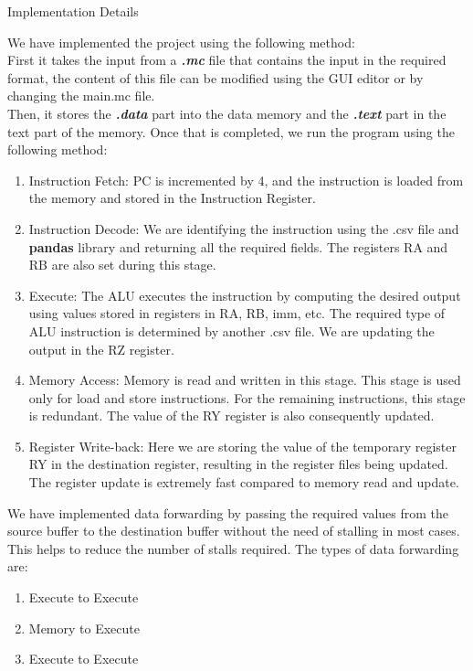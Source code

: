 \documentclass{article}
\begin{document}
\newpage
\begin{centering}
\begin{Huge}
\textsf{Implementation Details}\\
\end{Huge}
\end{centering}
\protect\vspace{1.0cm}
We have implemented the project using the following method:\\

First it takes the input from a \textsl{\textbf{.mc}} file that contains the input in the required format, the content of this file can be modified using the GUI editor or by changing the main.mc file.\\
Then, it stores the \textsl{\textbf{.data}} part into the data memory and the \textsl{\textbf{.text}} part in the text part of the memory.
Once that is completed, we run the program using the following method:
\begin{enumerate}
\item Instruction Fetch: PC is incremented by 4, and the instruction is loaded from the memory and stored in the Instruction Register.
\item Instruction Decode: We are identifying the instruction using the .csv file and {\bf pandas} library and returning all the required fields. The registers RA and RB are also set during this stage.
\item Execute: The ALU executes the instruction by computing the desired output using values stored in registers in RA, RB, imm, etc. The required type of ALU instruction is determined by another .csv file. We are updating the output in the RZ register.
\item Memory Access: Memory is read and written in this stage. This stage is used only for load and store instructions. For the remaining instructions, this stage is redundant. The value of the RY register is also consequently updated.
\item Register Write-back: Here we are storing the value of the temporary register RY in the destination register, resulting in the register files being updated. The register update is extremely fast compared to memory read and update.
\end{enumerate}
\newpage
We have implemented data forwarding by passing the required values from the source buffer to the destination buffer without the need of stalling in most cases. This helps to reduce the number of stalls required. The types of data forwarding are:
\begin{enumerate}
    \item Execute to Execute
    \item Memory to Execute
    \item Execute to Execute
\end{enumerate}
\\
\vspace{1cm}
\end{document}

